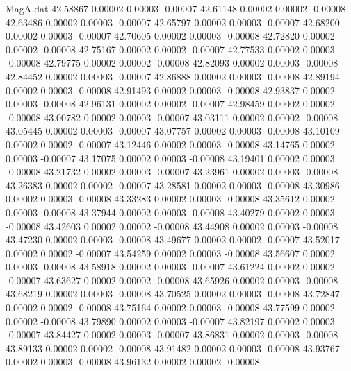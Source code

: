 \begin{filecontents}{MagA.dat}
  42.58867    0.00002    0.00003   -0.00007
  42.61148    0.00002    0.00002   -0.00008
  42.63486    0.00002    0.00003   -0.00007
  42.65797    0.00002    0.00003   -0.00007
  42.68200    0.00002    0.00003   -0.00007
  42.70605    0.00002    0.00003   -0.00008
  42.72820    0.00002    0.00002   -0.00008
  42.75167    0.00002    0.00002   -0.00007
  42.77533    0.00002    0.00003   -0.00008
  42.79775    0.00002    0.00002   -0.00008
  42.82093    0.00002    0.00003   -0.00008
  42.84452    0.00002    0.00003   -0.00007
  42.86888    0.00002    0.00003   -0.00008
  42.89194    0.00002    0.00003   -0.00008
  42.91493    0.00002    0.00003   -0.00008
  42.93837    0.00002    0.00003   -0.00008
  42.96131    0.00002    0.00002   -0.00007
  42.98459    0.00002    0.00002   -0.00008
  43.00782    0.00002    0.00003   -0.00007
  43.03111    0.00002    0.00002   -0.00008
  43.05445    0.00002    0.00003   -0.00007
  43.07757    0.00002    0.00003   -0.00008
  43.10109    0.00002    0.00002   -0.00007
  43.12446    0.00002    0.00003   -0.00008
  43.14765    0.00002    0.00003   -0.00007
  43.17075    0.00002    0.00003   -0.00008
  43.19401    0.00002    0.00003   -0.00008
  43.21732    0.00002    0.00003   -0.00007
  43.23961    0.00002    0.00003   -0.00008
  43.26383    0.00002    0.00002   -0.00007
  43.28581    0.00002    0.00003   -0.00008
  43.30986    0.00002    0.00003   -0.00008
  43.33283    0.00002    0.00003   -0.00008
  43.35612    0.00002    0.00003   -0.00008
  43.37944    0.00002    0.00003   -0.00008
  43.40279    0.00002    0.00003   -0.00008
  43.42603    0.00002    0.00002   -0.00008
  43.44908    0.00002    0.00003   -0.00008
  43.47230    0.00002    0.00003   -0.00008
  43.49677    0.00002    0.00002   -0.00007
  43.52017    0.00002    0.00002   -0.00007
  43.54259    0.00002    0.00003   -0.00008
  43.56607    0.00002    0.00003   -0.00008
  43.58918    0.00002    0.00003   -0.00007
  43.61224    0.00002    0.00002   -0.00007
  43.63627    0.00002    0.00002   -0.00008
  43.65926    0.00002    0.00003   -0.00008
  43.68219    0.00002    0.00003   -0.00008
  43.70525    0.00002    0.00003   -0.00008
  43.72847    0.00002    0.00002   -0.00008
  43.75164    0.00002    0.00003   -0.00008
  43.77599    0.00002    0.00002   -0.00008
  43.79890    0.00002    0.00003   -0.00007
  43.82197    0.00002    0.00003   -0.00007
  43.84427    0.00002    0.00003   -0.00007
  43.86831    0.00002    0.00003   -0.00008
  43.89133    0.00002    0.00002   -0.00008
  43.91482    0.00002    0.00003   -0.00008
  43.93767    0.00002    0.00003   -0.00008
  43.96132    0.00002    0.00002   -0.00008

\end{filecontents}
